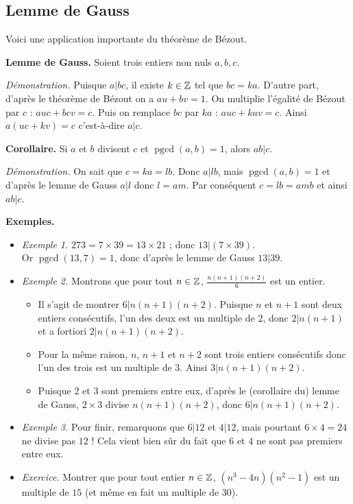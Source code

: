 \documentclass[11pt,class=report,crop=false]{standalone}
\newcommand{\pgcd}{\mathop{\mathrm{pgcd}}\nolimits}
\begin{document}
\subsection*{Lemme de Gauss}

Voici une application importante du théorème de Bézout.

\textbf{Lemme de Gauss.} Soient trois entiers non nuls $a,b,c$. \mybox{Si $a|bc$ et $\pgcd(a,b)=1$, alors $a|c$}
    
\emph{Démonstration.} Puisque $a|bc$, il existe  $k\in \mathbb{Z}$ tel que $bc=ka$. D'autre part, d'après le théorème de Bézout on a $au+bv=1$.
On multiplie l'égalité de Bézout par $c$ : $auc+bcv=c$.
Puis on remplace $bc$ par $ka$ : $auc+kav=c$.
Ainsi $a(uc+kv)=c$ c'est-à-dire  $a|c$.

\bigskip


\textbf{Corollaire.}
Si $a$ et $b$ divisent $c$ et $\pgcd(a,b)=1$, alors $ab|c$.
    
\emph{Démonstration.} On sait que $c=ka=lb$. Donc $a|lb$, mais $\pgcd(a,b)=1$ et d'après le lemme de Gauss $a|l$ donc $l=am$. Par conséquent $c=lb=amb$ et ainsi $ab|c$.

\bigskip


\textbf{Exemples.}
\begin{itemize}
  \item \emph{Exemple 1.} $273 = 7 \times 39 = 13 \times 21$ ; donc $13|(7 \times 39)$.\\ Or $\pgcd(13,7)=1$, donc d'après le lemme de Gauss $13|39$.
  
  \item \emph{Exemple 2.} Montrons que pour tout $n \in \mathbb{Z}$, $\frac{n(n+1)(n+2)}{6}$ est un entier.
  
  \begin{itemize}
    \item Il s'agit de montrer $6|n(n+1)(n+2)$. Puisque $n$ et $n+1$ sont deux entiers consécutifs, l'un des deux est un multiple de $2$, donc $2|n(n+1)$ et a fortiori $2|n(n+1)(n+2)$.
    \item Pour la même raison, $n$, $n+1$ et $n+2$ sont trois entiers consécutifs donc l'un des trois est un multiple de $3$. Ainsi $3|n(n+1)(n+2)$.
    \item Puisque $2$ et $3$ sont premiers entre eux, d'après le (corollaire du) lemme de Gauss, $2\times3$ divise $n(n+1)(n+2)$, donc $6|n(n+1)(n+2)$.
  \end{itemize}
  \item \emph{Exemple 3.} Pour finir, remarquons que $6|12$ et $4|12$, mais pourtant $6\times4=24$ ne divise pas $12$ ! Cela vient bien sûr du fait que $6$ et $4$ ne sont pas premiers entre eux.
  
  \item \emph{Exercice.} Montrer que pour tout entier $n \in \mathbb{Z}$, $(n^3-4n)(n^2-1)$ est un multiple de $15$ (et même en fait un multiple de $30$).  
   
\end{itemize}
\end{document}
